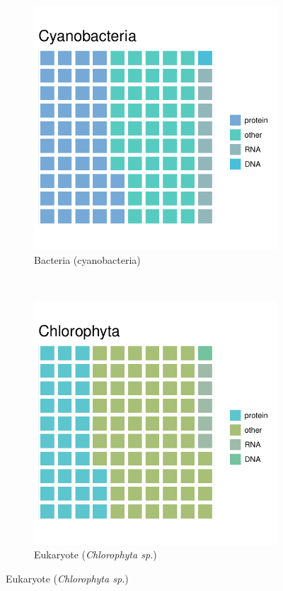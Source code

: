 \begin{figure}[H]
\begin{subfigure}[b]{0.3\textwidth}
        \includegraphics[width=\textwidth]{graphics/plots/20180303_waffle_cyano.pdf}
        \caption{Bacteria (cyanobacteria)}
        \label{sfig:slabel2}
    \end{subfigure}
    ~
    \begin{subfigure}[b]{0.3\textwidth}
        \includegraphics[width=\textwidth]{graphics/plots/20180303_waffle_chlorophyte.pdf}
        \caption{Eukaryote (\textit{Chlorophyta sp.})}
        \label{sfig:slabel2}
    \end{subfigure}
\end{figure}

